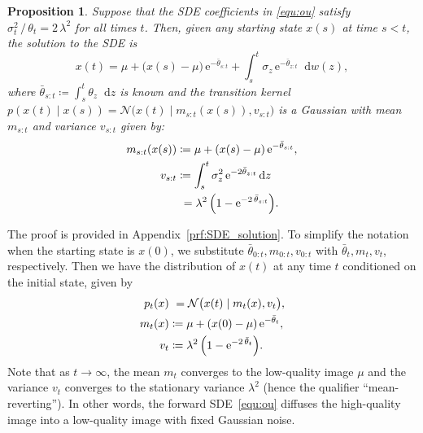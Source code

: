 \documentclass{article}
\newcommand{\diff}{\mathop{}\!\mathrm{d}}
\newcommand{\expp}{\mathrm{e}}
\newcommand{\cond}{{\;|\;}}
\theoremstyle{plain}
\newtheorem{proposition}[theorem]{Proposition}
\theoremstyle{definition}
\theoremstyle{remark}
\begin{document}
\begin{proposition}
    Suppose that the SDE coefficients in \eqref{equ:ou} satisfy $\sigma_t^2 \, / \, \theta_t = 2 \, \lambda^2$ for all times $t$. Then, given any starting state ${x}(s)$ at time $s < t$, the solution to the SDE is
\begin{equation}
        {x}(t) = \mu + \bigl({x}(s) - \mu \bigr) \, \expp^{-\bar{\theta}_{s:t}} + \int^t_s \sigma_z \, \expp^{-\bar{\theta}_{z:t}} \diff w(z),
    \end{equation}
where $\bar{\theta}_{s:t} \coloneqq \int^t_s \theta_z \diff z$ is known and the transition kernel $p({x}(t) \cond {x}(s)) = \mathcal{N}\bigl({x}(t) \cond m_{s:t}({x}(s)), v_{s:t}\bigr)$ is a Gaussian with mean $m_{s:t}$ and variance $v_{s:t}$ given by:
    \begin{equation}
        \begin{split}
        m_{s:t}(x(s)) &\coloneqq \mu + ({x}(s) - \mu) \, \expp^{-\bar{\theta}_{s:t}}, \\
        v_{s:t} &\coloneqq \int^t_s \sigma_z^2 \, \expp^{-2\bar{\theta}_{z:t}} \diff z \\
        & \ = \lambda^2 \, \Bigl(1 - \expp^{-2 \, \bar{\theta}_{s:t}}\Bigr).
        \end{split}
    \end{equation}
\label{prop:forward_sde_solution}
\end{proposition}

The proof is provided in Appendix~\ref{prf:SDE_solution}. To simplify the notation when the starting state is ${x}(0)$, we substitute $\bar{\theta}_{0:t}, m_{0:t}, v_{0:t}$ with $\bar{\theta}_{t}, m_{t}, v_{t}$, respectively. 
Then we have the distribution of ${x}(t)$ at any time $t$ conditioned on the initial state, given by
\begin{equation}
    \begin{split}
    p_t({x}) & \ = \mathcal{N}\bigl({x}(t) \cond m_{t}({x}), v_{t}\bigr), \\
    m_{t}({x}) &\coloneqq \mu + ({x}(0) - \mu) \, \expp^{-\bar{\theta}_{t}}, \\
    v_{t} & \coloneqq \lambda^2 \, \Bigl(1 - \expp^{-2 \, \bar{\theta}_{t}}\Bigr).
    \end{split}
    \label{eq:sde_gauss_mean_var}
\end{equation}
Note that as $t \to \infty$, the mean $m_{t}$ converges to the low-quality image $\mu$ and the variance $v_{t}$ converges to the stationary variance $\lambda^2$ (hence the qualifier ``mean-reverting''). In other words, the forward SDE~\eqref{equ:ou} diffuses the high-quality image into a low-quality image with fixed Gaussian noise.
\end{document}
